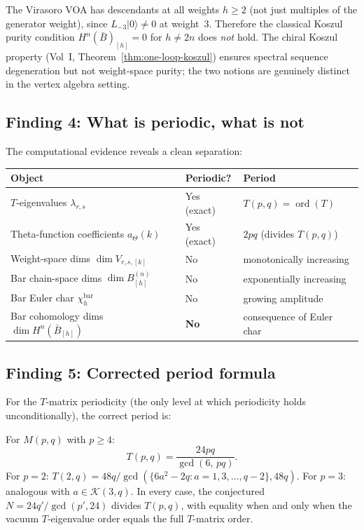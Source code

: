 \documentclass[11pt]{article}
\begin{document}
\begin{remark}
\label{rem:chiral-koszul-no-purity}
The Virasoro VOA has descendants at all weights $h \ge 2$
(not just multiples of the generator weight), since
$L_{-3}\lvert 0\rangle \ne 0$ at weight~$3$.  Therefore the
classical Koszul purity condition
$H^n(\bar{B})_{[h]} = 0$ for $h \ne 2n$ does \emph{not}
hold.  The chiral Koszul property
(Vol~I, Theorem~\ref*{thm:one-loop-koszul}) ensures spectral
sequence degeneration but not weight-space purity; the two
notions are genuinely distinct in the vertex algebra setting.
\end{remark}

\subsection*{Finding 4: What is periodic, what is not}

The computational evidence reveals a clean separation:

\begin{center}
\small
\renewcommand{\arraystretch}{1.2}
\begin{tabular}{lll}
\textbf{Object} & \textbf{Periodic?} & \textbf{Period} \\
\hline
$T$-eigenvalues $\lambda_{r,s}$
  & Yes (exact) & $T(p,q) = \operatorname{ord}(T)$ \\[2pt]
Theta-function coefficients $a_\Theta(k)$
  & Yes (exact) & $2pq$ (divides $T(p,q)$) \\[2pt]
Weight-space dims $\dim V_{r,s,[k]}$
  & No & monotonically increasing \\[2pt]
Bar chain-space dims $\dim B^{(n)}_{[h]}$
  & No & exponentially increasing \\[2pt]
Bar Euler char $\chi^{\operatorname{bar}}_h$
  & No & growing amplitude \\[2pt]
Bar cohomology dims $\dim H^n(\bar{B}_{[h]})$
  & \textbf{No} & consequence of Euler char
\end{tabular}
\end{center}

\subsection*{Finding 5: Corrected period formula}

For the $T$-matrix periodicity (the only level at which
periodicity holds unconditionally), the correct period is:

\begin{proposition}
\label{prop:corrected-T-period}
For $M(p,q)$ with $p \ge 4$:
\[
T(p,q) = \frac{24pq}{\gcd(6,\, pq)}.
\]
For $p = 2$: $T(2,q) = 48q / \gcd(\{6a^2 - 2q : a = 1, 3, \ldots, q{-}2\}, 48q)$.
For $p = 3$: analogous with $a \in \mathcal{K}(3,q)$.
In every case, the conjectured $N = 24q'/\gcd(p',24)$ divides
$T(p,q)$, with equality when and only when the vacuum
$T$-eigenvalue order equals the full $T$-matrix order.
\end{proposition}
\end{document}
